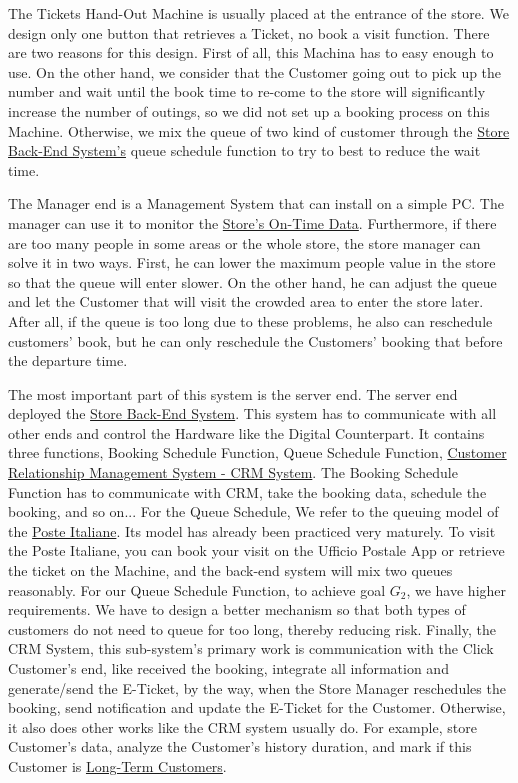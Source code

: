 \documentclass[a4paper,12pt]{report}
\begin{document}
The Tickets Hand-Out Machine is usually placed at the entrance of the store. We design only one button that retrieves a Ticket, no book a visit function. There are two reasons for this design. First of all, this Machina has to easy enough to use. On the other hand, we consider that the Customer going out to pick up the number and wait until the book time to re-come to the store will significantly increase the number of outings, so we did not set up a booking process on this Machine.  Otherwise, we mix the queue of two kind of customer through the \hyperref[Definitions]{Store Back-End System's} queue schedule function to try to best to reduce the wait time.

The Manager end is a Management System that can install on a simple PC. The manager can use it to monitor the \hyperref[Definitions]{Store's On-Time Data}. Furthermore, if there are too many people in some areas or the whole store, the store manager can solve it in two ways. First, he can lower the maximum people value in the store so that the queue will enter slower. On the other hand, he can adjust the queue and let the Customer that will visit the crowded area to enter the store later. After all, if the queue is too long due to these problems, he also can reschedule customers’ book, but he can only reschedule the Customers' booking that before the departure time. 

The most important part of this system is the server end. The server end deployed the \hyperref[Definitions]{Store Back-End System}. This system has to communicate with all other ends and control the Hardware like the Digital Counterpart. It contains three functions, Booking Schedule Function, Queue Schedule Function, \hyperref[Reference documents]{Customer Relationship Management System - CRM System}. The Booking Schedule Function has to communicate with CRM, take the booking data, schedule the booking, and so on... For the Queue Schedule, We refer to the queuing model of the \hyperref[Reference documents]{Poste Italiane}. Its model has already been practiced very maturely. To visit the Poste Italiane, you can book your visit on the Ufficio Postale App or retrieve the ticket on the Machine, and the back-end system will mix two queues reasonably. For our Queue Schedule Function, to achieve goal $G_2$, we have higher requirements. We have to design a better mechanism so that both types of customers do not need to queue for too long, thereby reducing risk. Finally, the CRM System, this sub-system's primary work is communication with the Click Customer's end, like received the booking, integrate all information and generate/send the E-Ticket, by the way, when the Store Manager reschedules the booking, send notification and update the E-Ticket for the Customer. Otherwise, it also does other works like the CRM system usually do. For example, store Customer's data, analyze the Customer's history duration, and mark if this Customer is  \hyperref[Definitions]{Long-Term Customers}.
\end{document}
